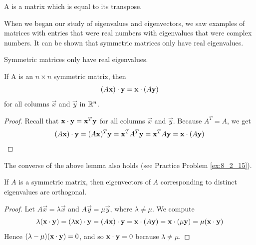 \documentclass{ximera}
\begin{document}
A  is a matrix which is equal to its transpose.  

When we began our study of eigenvalues and eigenvectors, we saw examples of matrices with entries that were real numbers with eigenvalues that were complex numbers.  It can be shown that symmetric matrices only have real eigenvalues.  

\begin{fact}
    Symmetric matrices only have real eigenvalues.
\end{fact}

\begin{lemma}\label{th:dotpSymmetric}
If A is an $n \times n$ symmetric matrix, then
\begin{equation*}
(A\mathbf{x}) \cdot \mathbf{y} = \mathbf{x} \cdot (A\mathbf{y})
\end{equation*}
for all columns $\vec{x}$ and $\vec{y}$ in $\mathbb{R}^n$.
\end{lemma}

\begin{proof}
Recall that $\mathbf{x} \cdot \mathbf{y} = \mathbf{x}^{T} \mathbf{y}$ for all columns $\vec{x}$ and $\vec{y}$. Because $A^{T} = A$, we get
\begin{equation*}
(A\mathbf{x}) \cdot \mathbf{y} = (A\mathbf{x})^T\mathbf{y} = \mathbf{x}^TA^T\mathbf{y} =  \mathbf{x}^TA\mathbf{y} = \mathbf{x} \cdot (A\mathbf{y})
\end{equation*}
\end{proof}

\begin{remark}
The converse of the above lemma also holds (see Practice Problem \ref{ex:8_2_15}).
\end{remark}

\begin{theorem}\label{th:symmetric_has_ortho_ev}
If $A$ is a symmetric matrix, then eigenvectors of $A$ corresponding to distinct eigenvalues are orthogonal.
\end{theorem}

\begin{proof}
Let $A\vec{x} = \lambda \vec{x}$ and $A\vec{y} = \mu \vec{y}$, where $\lambda \neq \mu$. We compute
\begin{equation*}
\lambda(\mathbf{x} \cdot \mathbf{y}) = (\lambda\mathbf{x}) \cdot \mathbf{y} = (A\mathbf{x}) \cdot \mathbf{y} = \mathbf{x} \cdot (A\mathbf{y}) = \mathbf{x} \cdot (\mu\mathbf{y}) = \mu(\mathbf{x} \cdot \mathbf{y})
\end{equation*}
Hence $(\lambda - \mu)(\mathbf{x} \cdot \mathbf{y}) = 0$, and so $\mathbf{x} \cdot \mathbf{y} = 0$ because $\lambda \neq \mu$.
\end{proof}
\end{document}
